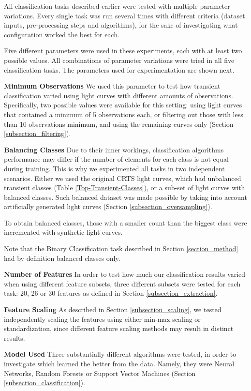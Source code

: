 All classification tasks described earlier were tested with multiple parameter variations. Every single task was run several times with different criteria (dataset inputs, pre-processing steps and algorithms), for the sake of investigating what configuration worked the best for each.

Five different parameters were used in these experiments, each with at least two possible values. All combinations of parameter variations were tried in all five classification tasks. The parameters used for experimentation are shown next.

\begin{description}
    \item \textbf{Minimum Observations} We used this parameter to test how transient classification varied using light curves with different amounts of observations. Specifically, two possible values were available for this setting: using light curves that contained a minimum of 5 observations each, or filtering out those with less than 10 observations minimum, and using the remaining curves only (Section \ref{subsection_filtering}).
    \item \textbf{Balancing Classes} Due to their inner workings, classification algorithms performance may differ if the number of elements for each class is not equal during training. This is why we experimented all tasks in two independent scenarios. Either we used the original CRTS light curves, which had unbalanced transient classes (Table \ref{Top-Transient-Classes}), or a sub-set of light curves with balanced classes. Such balanced dataset was made possible by taking into account artificially generated light curves (Section \ref{subsection_oversampling}). 
    
    To obtain balanced classes, those with a smaller count than the biggest class were incremented with synthetic light curves.
    
    Note that the Binary Classification task described in Section \ref{section_method} had by definition balanced classes only.
    
    \item \textbf{Number of Features} In order to test how much our classification results varied when using different feature subsets, three different subsets were tested for each task: 20, 26 or 30 features as defined in Section \ref{subsection_extraction}.
    \item \textbf{Feature Scaling} As described in Section \ref{subsection_scaling}, we tested independently scaling the features using either min-max scaling or standardization, since different feature scaling methods may result in distinct results.
    \item \textbf{Model Used} Three substantially different algorithms were tested, in order to investigate which learned the better from the data. Namely, they were Neural Networks, Random Forests or Support Vector Machines (Section \ref{subsection_classification}).
\end{description}
